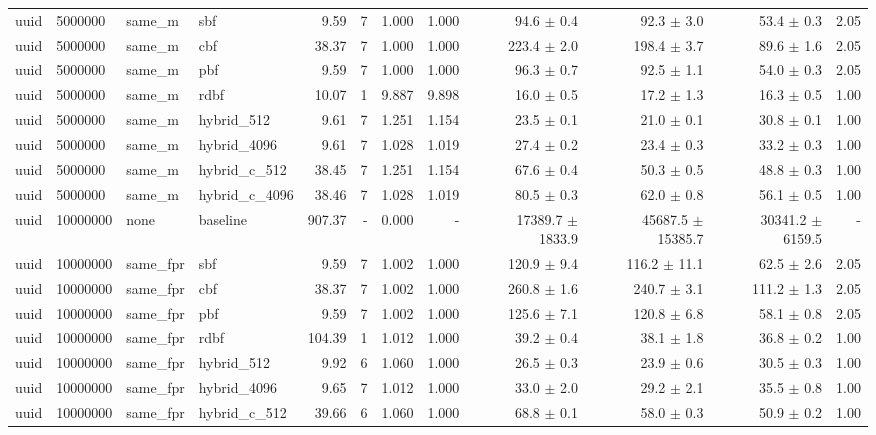 \begin{tabular}{llllrrrrrrrr}
uuid & 5000000 & same\_m & sbf & 9.59 & 7 & 1.000 & 1.000 & 94.6 $\pm$ 0.4 & 92.3 $\pm$ 3.0 & 53.4 $\pm$ 0.3 & 2.05 \\
uuid & 5000000 & same\_m & cbf & 38.37 & 7 & 1.000 & 1.000 & 223.4 $\pm$ 2.0 & 198.4 $\pm$ 3.7 & 89.6 $\pm$ 1.6 & 2.05 \\
uuid & 5000000 & same\_m & pbf & 9.59 & 7 & 1.000 & 1.000 & 96.3 $\pm$ 0.7 & 92.5 $\pm$ 1.1 & 54.0 $\pm$ 0.3 & 2.05 \\
uuid & 5000000 & same\_m & rdbf & 10.07 & 1 & 9.887 & 9.898 & 16.0 $\pm$ 0.5 & 17.2 $\pm$ 1.3 & 16.3 $\pm$ 0.5 & 1.00 \\
uuid & 5000000 & same\_m & hybrid\_512 & 9.61 & 7 & 1.251 & 1.154 & 23.5 $\pm$ 0.1 & 21.0 $\pm$ 0.1 & 30.8 $\pm$ 0.1 & 1.00 \\
uuid & 5000000 & same\_m & hybrid\_4096 & 9.61 & 7 & 1.028 & 1.019 & 27.4 $\pm$ 0.2 & 23.4 $\pm$ 0.3 & 33.2 $\pm$ 0.3 & 1.00 \\
uuid & 5000000 & same\_m & hybrid\_c\_512 & 38.45 & 7 & 1.251 & 1.154 & 67.6 $\pm$ 0.4 & 50.3 $\pm$ 0.5 & 48.8 $\pm$ 0.3 & 1.00 \\
uuid & 5000000 & same\_m & hybrid\_c\_4096 & 38.46 & 7 & 1.028 & 1.019 & 80.5 $\pm$ 0.3 & 62.0 $\pm$ 0.8 & 56.1 $\pm$ 0.5 & 1.00 \\
uuid & 10000000 & none & baseline & 907.37 & - & 0.000 & - & 17389.7 $\pm$ 1833.9 & 45687.5 $\pm$ 15385.7 & 30341.2 $\pm$ 6159.5 & - \\
uuid & 10000000 & same\_fpr & sbf & 9.59 & 7 & 1.002 & 1.000 & 120.9 $\pm$ 9.4 & 116.2 $\pm$ 11.1 & 62.5 $\pm$ 2.6 & 2.05 \\
uuid & 10000000 & same\_fpr & cbf & 38.37 & 7 & 1.002 & 1.000 & 260.8 $\pm$ 1.6 & 240.7 $\pm$ 3.1 & 111.2 $\pm$ 1.3 & 2.05 \\
uuid & 10000000 & same\_fpr & pbf & 9.59 & 7 & 1.002 & 1.000 & 125.6 $\pm$ 7.1 & 120.8 $\pm$ 6.8 & 58.1 $\pm$ 0.8 & 2.05 \\
uuid & 10000000 & same\_fpr & rdbf & 104.39 & 1 & 1.012 & 1.000 & 39.2 $\pm$ 0.4 & 38.1 $\pm$ 1.8 & 36.8 $\pm$ 0.2 & 1.00 \\
uuid & 10000000 & same\_fpr & hybrid\_512 & 9.92 & 6 & 1.060 & 1.000 & 26.5 $\pm$ 0.3 & 23.9 $\pm$ 0.6 & 30.5 $\pm$ 0.3 & 1.00 \\
uuid & 10000000 & same\_fpr & hybrid\_4096 & 9.65 & 7 & 1.012 & 1.000 & 33.0 $\pm$ 2.0 & 29.2 $\pm$ 2.1 & 35.5 $\pm$ 0.8 & 1.00 \\
uuid & 10000000 & same\_fpr & hybrid\_c\_512 & 39.66 & 6 & 1.060 & 1.000 & 68.8 $\pm$ 0.1 & 58.0 $\pm$ 0.3 & 50.9 $\pm$ 0.2 & 1.00 \\

\end{tabular}

